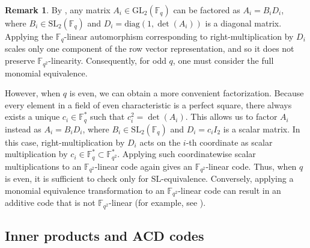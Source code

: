 \documentclass[10pt,a4paper]{amsart}
\theoremstyle{plain}
\theoremstyle{definition}
\newtheorem{remark}{Remark}
\begin{document}
\begin{remark} \label{remarkeven}
By \cite[Lemma 13.3.8]{mullen2013}, any matrix $A_i \in \mathrm{GL}_2(\mathbb{F}_q)$ can   be factored as $A_i = B_i D_i$, where $B_i \in \mathrm{SL}_2(\mathbb{F}_q)$ and $D_i = \mathrm{diag}(1, \det(A_i))$ is a diagonal matrix. Applying the $\mathbb{F}_q$-linear automorphism corresponding to right-multiplication by $D_i$ scales only one component of the row vector representation, and so it does not preserve $\mathbb{F}_{q^2}$-linearity. Consequently, for odd $q$, one must consider the full monomial equivalence.

However, when $q$ is even, we can obtain a more convenient factorization. Because every element in a field of even characteristic is a perfect square, there always exists a unique $c_i \in \mathbb{F}_q^*$ such that $c_i^2 = \det(A_i)$. 
This allows us to factor $A_i$ instead as $A_i = B_i D_i$, where $B_i \in \mathrm{SL}_2(\mathbb{F}_q)$ and $D_i = c_i I_2$ is a scalar matrix. In this case, right-multiplication by $D_i$ acts on the $i$-th coordinate as scalar multiplication by $c_i \in \mathbb{F}_q^* \subset \mathbb{F}_{q^2}^*$. Applying such coordinatewise scalar multiplications to an $\mathbb{F}_{q^2}$-linear code again gives an $\mathbb{F}_{q^2}$-linear code.  Thus, when $q$ is even, it is sufficient to check only for $\mathrm{SL}$-equivalence.
Conversely, applying a monomial equivalence transformation to an $\mathbb{F}_{q^2}$-linear code can result in an additive code that is not $\mathbb{F}_{q^2}$-linear (for example, see \cite[Exercise 558]{huffman2010}).
\end{remark}


\subsection{Inner products and ACD codes}
\end{document}
